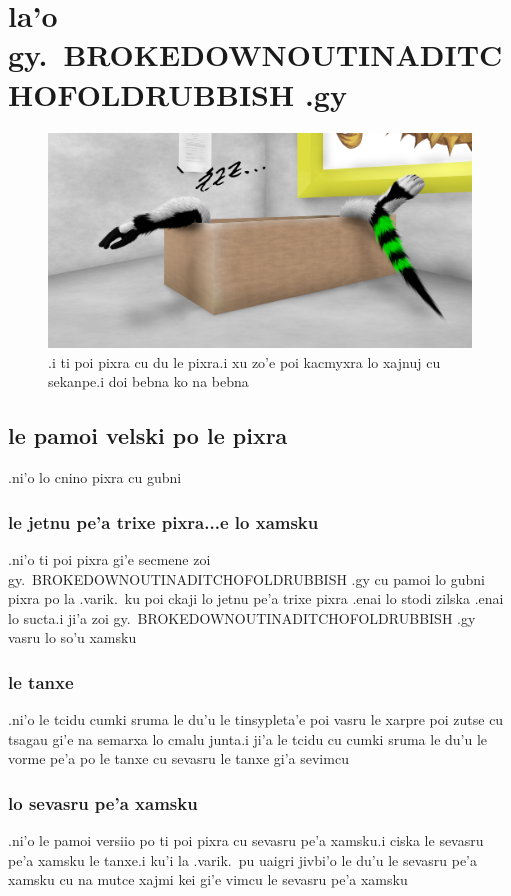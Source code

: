 \documentclass{report}
\begin{document}
\chapter{la'o gy.\ BROKEDOWNOUTINADITCHOFOLDRUBBISH .gy}
\begin{figure}[ht]
	\centering
	\includegraphics[width=\textwidth]{brokedownoutinaditchofoldrubbish/brokedownoutinaditchofoldrubbish.png}
	\caption[center]{.i ti poi pixra cu du le pixra\@  .i xu zo'e poi kacmyxra lo xajnuj cu sekanpe\@  .i doi bebna ko na bebna}
\end{figure}
\section{le pamoi velski po le pixra}
.ni'o lo cnino pixra cu gubni
\subsection{le jetnu pe'a trixe pixra...e lo xamsku}
.ni'o ti poi pixra gi'e secmene zoi gy.\ BROKEDOWNOUTINADITCHOFOLDRUBBISH .gy cu pamoi lo gubni pixra po la .varik.\ ku poi ckaji lo jetnu pe'a trixe pixra .enai lo stodi zilska .enai lo sucta\@  .i ji'a zoi gy.\ BROKEDOWNOUTINADITCHOFOLDRUBBISH .gy vasru lo so'u xamsku
\subsection{le tanxe}
.ni'o le tcidu cumki sruma le du'u le tinsypleta'e poi vasru le xarpre poi zutse cu tsagau gi'e na semarxa lo cmalu junta\@  .i ji'a le tcidu cu cumki sruma le du'u le vorme pe'a po le tanxe cu sevasru le tanxe gi'a sevimcu
\subsection{lo sevasru pe'a xamsku}
.ni'o le pamoi versiio po ti poi pixra cu sevasru pe'a xamsku\@  .i ciska le sevasru pe'a xamsku le tanxe\@  .i ku'i la .varik.\ pu uaigri jivbi'o le du'u le sevasru pe'a xamsku cu na mutce xajmi kei gi'e vimcu le sevasru pe'a xamsku
\end{document}
